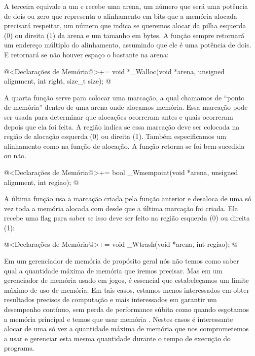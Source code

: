 A terceira equivale a um  e recebe uma arena, um
número que será uma potência de dois ou zero que representa o
alinhamento em bits que a memória alocada precisará respeitar, um
número que indica se queremos alocar da pilha esquerda (0) ou direita
(1) da arena e um tamanho em bytes. A função sempre retornará um
endereço múltiplo do alinhamento, assumindo que ele é uma potência de
dois. E retornará  se não houver espaço o bastante na
arena:

\iniciocodigo
@<Declarações de Memória@>+=
void *_Walloc(void *arena, unsigned alignment, int right, size_t size);
@
\fimcodigo

A quarta função serve para colocar uma marcação, a qual chamamos de
``ponto de memória'' dentro de uma arena onde alocamos memória. Essa
marcação pode ser usada para determinar que alocações ocorreram antes
e quais ocorreram depois que ela foi feita. A região indica se essa
marcação deve ser colocada na região de alocação esquerda (0) ou
direita (1). Também especificamos um alinhamento como na função de
alocação. A função retorna se foi bem-sucedida ou não.

\iniciocodigo
@<Declarações de Memória@>+=
bool _Wmempoint(void *arena, unsigned alignment, int regiao);
@
\fimcodigo

A última função usa a marcação criada pela função anterior e desaloca
de uma só vez toda a memória alocada com  desde que
a última marcação foi criada. Ela recebe uma flag para saber se isso
deve ser feito na região esquerda (0) ou direita (1):

\iniciocodigo
@<Declarações de Memória@>+=
void _Wtrash(void *arena, int regiao);
@
\fimcodigo



Em um gerenciador de memória de propósito geral nós não temos como
saber qual a quantidade máxima de memória que iremos precisar. Mas em
um gerenciador de memória usado em jogos, é essencial que
estabeleçamos um limite máximo de uso de memória. Em tais casos,
estamos menos interessados em obter resultados precisos de computação
e mais interessados em garantir um desempenho contínuo, sem perda de
performance súbita como quando esgotamos a memória principal e temos
que usar memória . Nestes casos é interessante alocar de
uma só vez a quantidade máxima de memória que nos comprometemos a usar
e gerenciar esta mesma quantidade durante o tempo de execução do
programa.

